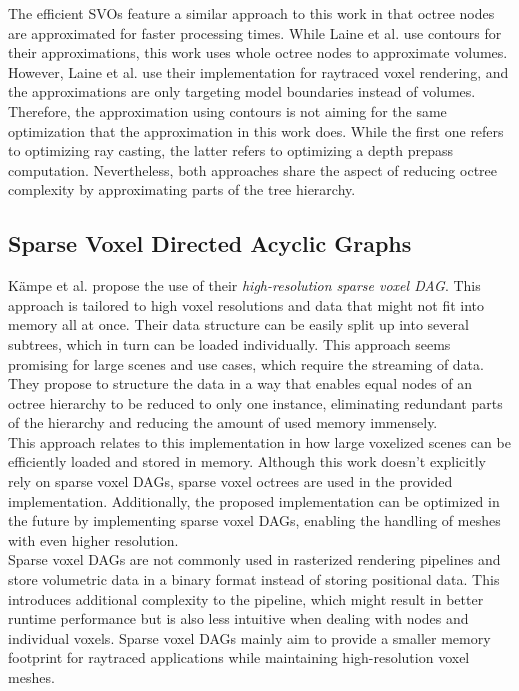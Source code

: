 \noindent
The efficient \ac{SVO}s feature a similar approach to this work in that octree nodes are approximated for faster 
processing times. While Laine et al. use contours for their approximations, this work uses whole octree nodes 
to approximate volumes. \\

\noindent
However, Laine et al. use their implementation for raytraced voxel rendering, and the approximations are only 
targeting model boundaries instead of volumes. Therefore, the approximation using contours is not aiming for the 
same optimization that the approximation in this work does. While the first one refers to optimizing ray casting, 
the latter refers to optimizing a depth prepass computation. Nevertheless, both approaches share the aspect of 
reducing octree complexity by approximating parts of the tree hierarchy.


\subsection*{Sparse Voxel Directed Acyclic Graphs}

Kämpe et al. \cite{Kampe2013} propose the use of their \emph{high-resolution sparse voxel \ac{DAG}}. This approach 
is tailored to high voxel resolutions and data that might not fit into memory all at once. Their data structure can 
be easily split up into several subtrees, which in turn can be loaded individually. This approach seems promising 
for large scenes and use cases, which require the streaming of data. They propose to structure the data in a way that 
enables equal nodes of an octree hierarchy to be reduced to only one instance, eliminating redundant parts of the 
hierarchy and reducing the amount of used memory immensely. \\

\noindent
This approach relates to this implementation in how large voxelized scenes can be efficiently loaded and stored in 
memory. Although this work doesn't explicitly rely on sparse voxel \ac{DAG}s, sparse voxel octrees are used in the 
provided implementation. Additionally, the proposed implementation can be optimized in the future by implementing 
sparse voxel \ac{DAG}s, enabling the handling of meshes with even higher resolution. \\

\noindent
Sparse voxel \ac{DAG}s are not commonly used in rasterized rendering pipelines and store volumetric data in a binary 
format instead of storing positional data. This introduces additional complexity to the pipeline, which might result in 
better runtime performance but is also less intuitive when dealing with nodes and individual voxels. Sparse voxel 
\ac{DAG}s mainly aim to provide a smaller memory footprint for raytraced applications while maintaining high-resolution 
voxel meshes. \\

